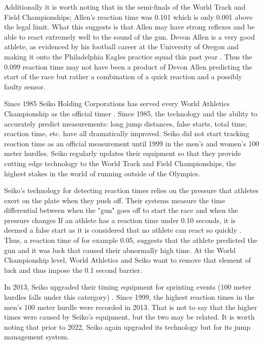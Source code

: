 \documentclass[12pt, letterpaper, titlepage]{article}
\begin{document}
Additionally it is worth noting that in the semi-finals of the World Track and
Field Championships; Allen's reaction time was 0.101 which is only 0.001 above
the legal limit.  What this suggests is that Allen may have strong reflexes
and be able to react extremely well to the sound of the gun.  Devon Allen is a
very good athlete, as evidenced by his football career at the University of Oregon
and making it onto the Philadelphia Eagles practice squad this past year \citep{Hurley}.
Thus the 0.099 reaction time may not have been a product of Devon Allen
predicting the start of the race but rather a combination of a quick reaction 
and a possibly faulty sensor.

Since 1985 Seiko Holding Corporations has served every World Athletics Championship
as the official timer \citep{Seiko}.  Since 1985, the technology and the ability
to accurately predict measurements: long jump distances, false starts, total time,
reaction time, etc. have all dramatically improved.  Seiko did not start tracking
reaction time as an official measurement until 1999 in the men's and women's 100 meter
hurdles.  Seiko regularly updates their equipment so that they provide cutting edge
technology to the World Track and Field Championships, the highest stakes in the world
of running outside of the Olympics.

Seiko's technology for detecting reaction times relies on the pressure that athletes
exert on the plate when they push off.  Their systems measure the time differential
between when the "gun" goes off to start the race and when the pressure changes 
\citep{Seiko}  If an athlete has a reaction time under 0.10 seconds, it is deemed a 
false start as it is considered that no athlete can react so quickly \citep{Seiko-Timing}.  
Thus, a reaction time of for example 0.05, suggests that the athlete predicted the gun and it
was luck that caused their abnormally high time.  At the World Championship level,
World Athletics and Seiko want to remove that element of luck and thus impose the 0.1
second barrier.

In 2013, Seiko upgraded their timing equipment for sprinting events (100 meter hurdles
falls under this catergory) \citep{WorldAthletics_2013}.  Since 1999, the highest reaction 
times in the men's 100 meter hurdle were recorded in 2013.  That is not to say that the higher 
times were caused by Seiko's equipment, but the two may be related.  It is worth noting that prior
to 2022, Seiko again upgraded its technology but for its jump management system.
\citep{Pilianidis}
\end{document}
